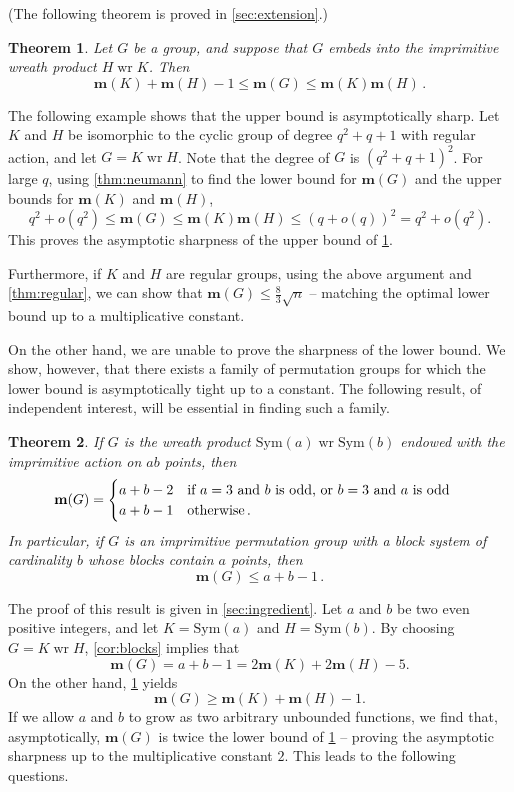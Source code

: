 \documentclass[a4paper]{amsart}
\newcommand{\Sym}{\mathrm{Sym}}
\renewcommand{\wr}{\mathop{\mathrm{wr}}}
\newcommand{\m}{\mathbf{m}}
\newtheorem{thmx}{Theorem}[]
\theoremstyle{definition}
\begin{document}
(The following theorem is proved in \cref{sec:extension}.)

\begin{thmx}\label{thm:boundsTransitive}
    Let $G$ be a group, and suppose that $G$ embeds into the imprimitive wreath product $H \wr K$. Then
    \[ \m(K) + \m(H) - 1 \le \m(G) \le \m(K) \m(H) \,.\]
\end{thmx}

The following example shows that the upper bound is asymptotically sharp. Let $K$ and $H$ be isomorphic to the cyclic group of degree $q^2+q+1$ with regular action, and let $G=K \wr H$. Note that the degree of $G$ is $(q^2+q+1)^2$. For large $q$, using \cref{thm:neumann} to find the lower bound for $\m(G)$ and the upper bounds for $\m(K)$ and $\m(H)$,
\[ q^2 + o(q^2) \le \m(G) \le \m(K) \m(H) \le (q + o(q))^2 = q^2 + o(q^2). \]
This proves the asymptotic sharpness of the upper bound of \cref{thm:boundsTransitive}. 

Furthermore, if $K$ and $H$ are regular groups, using the above argument and \cref{thm:regular}, we can show that $\m(G) \le \frac{8}{3}\sqrt{n}$ -- matching the optimal lower bound up to a multiplicative constant.

On the other hand, we are unable to prove the sharpness of the lower bound. 
We show, however, that there exists a family of permutation groups for which the lower bound is asymptotically tight up to a constant. The following result, of independent interest, will be essential in finding such a family. 
\begin{thmx}\label{thm:largeBlocks}\label{cor:blocks}
    If $G$ is the wreath product $\Sym(a) \wr \Sym(b)$ endowed with the imprimitive action on $ab$ points, then
    \[\m(G) = \begin{cases}
    a+b-2 \quad \hbox{if $a=3$ and $b$ is odd, or $b=3$ and $a$ is odd} \\
    a+b-1 \quad \hbox{otherwise} \,.
    \end{cases}\]
    In particular, if $G$ is an imprimitive permutation group with a block system of cardinality $b$ whose blocks contain $a$ points, then
    \[ \m(G) \le a + b - 1 \,.\]
\end{thmx}
The proof of this result is given in \cref{sec:ingredient}.
Let $a$ and $b$ be two even positive integers, and let $K=\Sym(a)$ and $H= \Sym(b)$. By choosing $G = K \wr H$, \cref{cor:blocks} implies that
\[ \m(G) = a + b - 1 = 2\m(K) + 2\m(H) - 5 .\]
On the other hand, \cref{thm:boundsTransitive} yields
\[ \m(G) \ge \m(K) + \m(H) - 1 .\]
If we allow $a$ and $b$ to grow as two arbitrary unbounded functions, we find that, asymptotically, $\m(G)$ is twice the lower bound of \cref{thm:boundsTransitive} -- proving the asymptotic sharpness up to the multiplicative constant $2$. This leads to the following questions.
\end{document}
